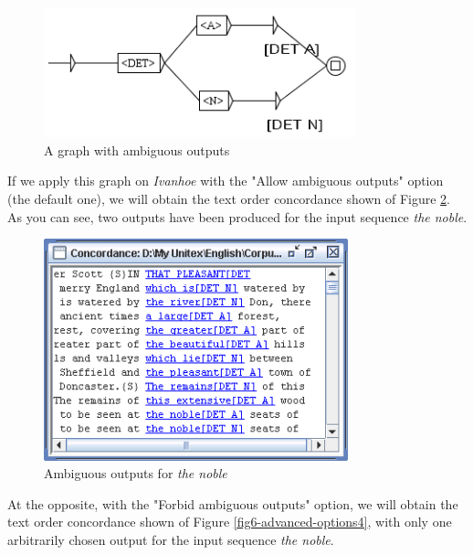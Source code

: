 \bigskip
\begin{figure}[!h]
\begin{center}
\includegraphics[width=9cm]{resources/img/fig6-advanced-options2.png}
\caption{A graph with ambiguous outputs\label{fig6-advanced-options2}}
\end{center}
\end{figure}

\noindent If we apply this graph on \textit{Ivanhoe} with the "Allow ambiguous
outputs" option (the default one), we will obtain the text order
concordance shown of Figure \ref{fig6-advanced-options3}. As you can see, two
outputs have been produced for the input sequence \textit{the noble}.

\bigskip
\begin{figure}[!h]
\begin{center}
\includegraphics[width=8.8cm]{resources/img/fig6-advanced-options3.png}
\caption{Ambiguous outputs for \textit{the noble}\label{fig6-advanced-options3}}
\end{center}
\end{figure}


\noindent At the opposite, with the "Forbid ambiguous
outputs" option, we will obtain the text order
concordance shown of Figure \ref{fig6-advanced-options4}, with only one
arbitrarily chosen output for the input sequence \textit{the noble}.

